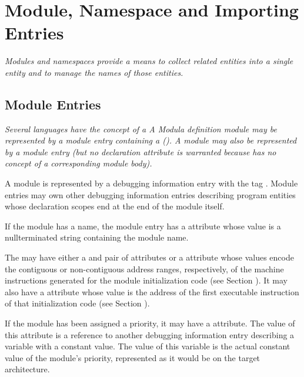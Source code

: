 \section{Module, Namespace and Importing Entries}
\textit{Modules and namespaces provide a means to collect related
entities into a single entity and to manage the names of
those entities.}

\subsection{Module Entries}
\label{chap:moduleentries}
\textit{Several languages have the concept of a 
A Modula definition module 
may be represented by a module
entry containing a 
(\DWATdeclaration). A
 module 
may also be represented by a module entry
(but no declaration attribute is warranted because 
has no concept of a corresponding module body).}

A module is represented by a debugging information entry
with the 
tag \DWTAGmoduleTARG.  
Module entries may own other
debugging information entries describing program entities
whose declaration scopes end at the end of the module itself.

If the module has a name, the module entry has a 
\DWATname{} attribute 
whose value is a null\dash terminated string containing
the module name.

The  may have either a 
\DWATlowpc{} and
\DWAThighpc{} 
pair 
of 
attributes or a 
\DWATranges{} attribute
whose values encode the contiguous or non-contiguous address
ranges, respectively, of the machine instructions generated for
the module initialization
code\hypertarget{chap:DWATentrypcentryaddressofmoduleinitialization}{} 
(see Section ). 
It may also have a
\DWATentrypc{} attribute whose value is the address of
the first executable instruction of that initialization code
(see Section ).

If\hypertarget{chap:DWATprioritymodulepriority}{}
the module has been assigned a priority, it may have a
\DWATpriorityDEFN{} attribute. 
The value of this attribute is a
reference to another debugging information entry describing
a variable with a constant value. The value of this variable
is the actual constant value of the module\textquoteright{s} priority,
represented as it would be on the target architecture.

